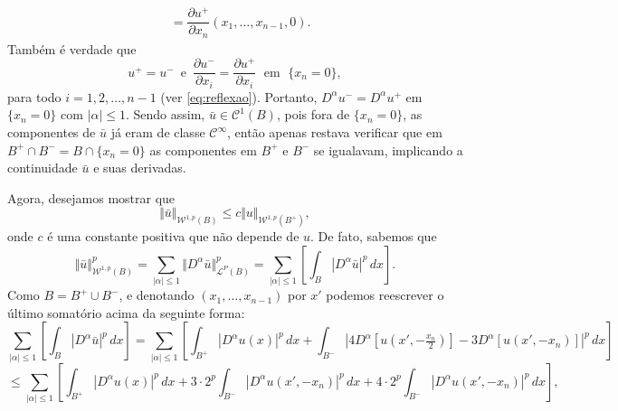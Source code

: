 \documentclass[a4paper, 11pt]{book}
\theoremstyle{definition}
\newcommand{\cC}{\mathcal{C}}
\newcommand{\cL}{\mathcal{L}}
\newcommand{\cW}{\mathcal{W}}
\begin{document}
\begin{prf}
\[\begin{aligned}
         &= \dfrac{\partial u^+}{\partial x_n}(x_1,\dots,x_{n-1},0).
        \end{aligned}
    \]
    Também é verdade que
    \[
        u^+ = u^- \,\text{ e }\, \dfrac{\partial u^-}{\partial x_i} = \dfrac{\partial u^+}{\partial x_i}  \;\text{ em }\; \{x_n = 0\},
    \]
    para todo $i = 1,2,\dots,n-1$ (ver \ref{eq:reflexao}). Portanto, $D^\alpha u^- = D^\alpha u^+$ em $\{x_n = 0\}$ com $|\alpha| \leqslant 1$. Sendo assim, $\bar u \in \cC^1 (B)$, pois fora de $\{x_n = 0\}$, as componentes de $\bar u$ já eram de classe $\cC^\infty$, então apenas restava verificar que em $B^+ \cap B^- = B \cap \{x_n = 0\}$ as componentes em $B^+$ e $B^-$ se igualavam, implicando a continuidade $\bar u$ e suas derivadas.

    Agora, desejamos mostrar que 
    \begin{equation} \label{eq:desigualdade-B-Bmais}
        \Vert \bar u \Vert_{\cW^{1,p}(B)} \leqslant c \Vert u \Vert_{\cW^{1,p}(B^+)},
    \end{equation}
    onde $c$ é uma constante positiva que não depende de $u$.
    De fato, sabemos que
    \[
        \Vert \bar u \Vert_{\cW^{1,p}(B)}^p = \sum_{|\alpha| \leqslant 1} \Vert D^\alpha\bar u \Vert_{\cL^P(B)}^p = \sum_{|\alpha| \leqslant 1} \left[\int_B |D^\alpha \bar u| ^p \,dx\right].
    \]
    Como $B = B^+ \cup B^-$, e denotando $(x_1,\dots,x_{n-1})$ por $x'$ podemos reescrever o último somatório acima da seguinte forma:
    \[
        \sum_{|\alpha| \leqslant 1} \left[\int_B |D^\alpha \bar u| ^p \,dx\right] = \sum_{|\alpha| \leqslant 1} \left[ \int_{B^+} |D^\alpha u(x)|^p \,dx + \int_{B^-} |4D^\alpha [u(x',-\tfrac{x_n}{2})] - 3D^\alpha [u(x',-x_n)] |^p \,dx \right]
    \]
    \[
        \leqslant \sum_{|\alpha| \leqslant 1} \left[ \int_{B^+} |D^\alpha u(x)|^p \,dx + 3 \cdot 2^p\int_{B^-} |D^\alpha u(x',-x_n)|^p \,dx + 4 \cdot 2^p\int_{B^-} |D^\alpha u(x',-x_n)|^p \,dx   \right], 
\]
\end{prf}
\end{document}
